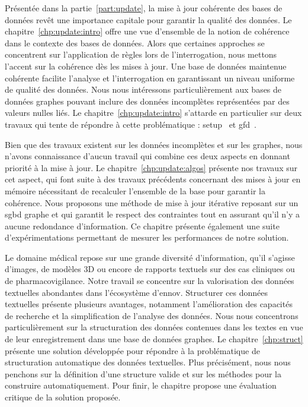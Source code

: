 \begin{description}
    \item[Mise à jour cohérente] Présentée dans la partie~\ref{part:update}, la mise à jour cohérente des bases de données revêt une importance capitale pour garantir la qualité des données.
    Le chapitre~\ref{chp:update:intro} offre une vue d'ensemble de la notion de cohérence dans le contexte des bases de données.
    Alors que certaines approches se concentrent sur l'application de règles lors de l'interrogation, nous mettons l'accent sur la cohérence dès les mises à jour.
    Une base de données maintenue cohérente facilite l'analyse et l'interrogation en garantissant un niveau uniforme de qualité des données.
    Nous nous intéressons particulièrement aux bases de données graphes pouvant inclure des données incomplètes représentées par des valeurs nulles liés.
    Le chapitre~\ref{chp:update:intro} s'attarde en particulier sur deux travaux qui tente de répondre à cette problématique : \acrfull{setup}~\cite{chabinUsingGraphGrammar2019} et \acrfull{gfd}~\cite{fanDependenciesGraphs2019}.

    Bien que des travaux existent sur les données incomplètes et sur les graphes, nous n'avons connaissance d'aucun travail qui combine ces deux aspects en donnant priorité à la mise à jour.
    Le chapitre~\ref{chp:update:algos} présente nos travaux sur cet aspect, qui font suite à des travaux précédents \cite{chabinConsistentUpdatingDatabases2020} concernant des mises à jour en mémoire nécessitant de recalculer l'ensemble de la base pour garantir la cohérence.
    Nous proposons une méthode de mise à jour itérative reposant sur un \gls{sgbd} graphe et qui garantit le respect des contraintes tout en assurant qu'il n'y a aucune redondance d'information.
    Ce chapitre présente également une suite d'expérimentations permettant de mesurer les performances de notre solution.

    \item Le domaine médical repose sur une grande diversité d'information, qu'il s'agisse d'images, de modèles 3D ou encore de rapports textuels sur des cas cliniques ou de pharmacovigilance.
    Notre travail se concentre sur la valorisation des données textuelles abondantes dans l'écosystème d'\gls{ennov}.
    Structurer ces données textuelles présente plusieurs avantages, notamment l'amélioration des capacités de recherche et la simplification de l'analyse des données.
    Nous nous concentrons particulièrement sur la structuration des données contenues dans les textes en vue de leur enregistrement dans une base de données graphes.
    Le chapitre~\ref{chp:struct} présente une solution développée pour répondre à la problématique de structuration automatique des données textuelles.
    Plus précisément, nous nous penchons sur la définition d'une structure valide et sur les méthodes pour la construire automatiquement.
    Pour finir, le chapitre propose une évaluation critique de la solution proposée.


\end{description}
